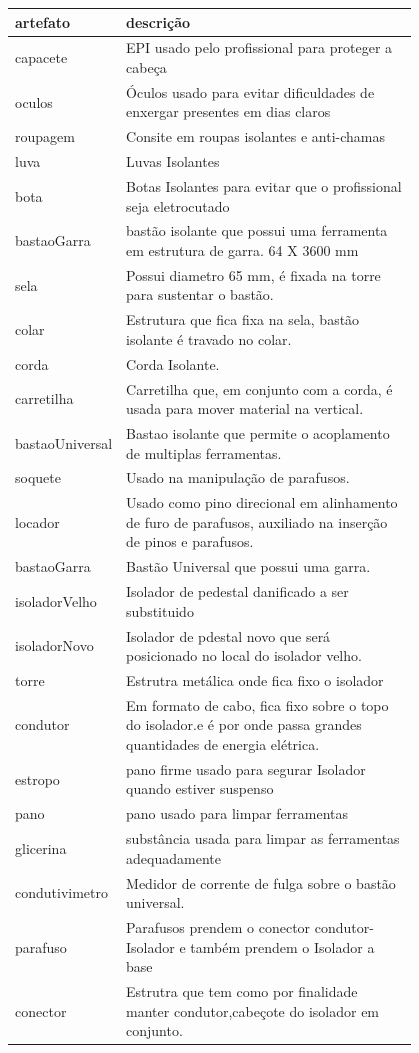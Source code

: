 \documentclass[12pt]{article}
\begin{document}
\begin{table}[H]
\centering
\begin{tabular}{|l|p{0.8\linewidth}|}
\hline
\textbf{artefato} & \textbf{descrição} \\ \hline
capacete & EPI usado pelo profissional para proteger a cabeça \\ \hline
oculos & Óculos usado para evitar dificuldades de enxergar presentes em dias claros \\ \hline
roupagem & Consite em roupas isolantes e anti-chamas \\ \hline
luva & Luvas Isolantes \\ \hline
bota & Botas Isolantes para evitar que o profissional seja eletrocutado \\ \hline
bastaoGarra & bastão isolante que possui uma ferramenta em estrutura de garra. 64 X 3600 mm \\ \hline
sela & Possui diametro 65 mm, é fixada na torre para sustentar o bastão. \\ \hline
colar & Estrutura que fica fixa na sela, bastão isolante é travado no colar. \\ \hline
corda & Corda Isolante. \\ \hline
carretilha & Carretilha que, em conjunto com a corda, é usada para mover material na vertical. \\ \hline
bastaoUniversal & Bastao isolante que permite o acoplamento de multiplas ferramentas. \\ \hline
soquete & Usado na manipulação de parafusos. \\ \hline
locador & Usado como pino direcional em alinhamento de furo de parafusos, auxiliado na inserção de pinos e parafusos. \\ \hline
bastaoGarra & Bastão Universal que possui uma garra. \\ \hline
isoladorVelho & Isolador de pedestal danificado a ser substituido \\ \hline
isoladorNovo & Isolador de pdestal novo que será posicionado no local do isolador velho. \\ \hline
torre & Estrutra metálica onde fica fixo o isolador \\ \hline
condutor & Em formato de cabo, fica fixo sobre o topo do isolador.e é por onde passa grandes quantidades de energia elétrica. \\ \hline
estropo & pano firme usado para segurar Isolador quando estiver suspenso \\ \hline
pano & pano usado para limpar ferramentas \\ \hline
glicerina & substância usada para limpar as ferramentas adequadamente \\ \hline
condutivimetro & Medidor de corrente de fulga sobre o bastão universal. \\ \hline
parafuso & Parafusos prendem o conector condutor-Isolador e também prendem o Isolador a base \\ \hline
conector & Estrutra que tem como por finalidade manter condutor,cabeçote do isolador em conjunto. \\ \hline
\end{tabular}
\end{table} 
\end{document}
